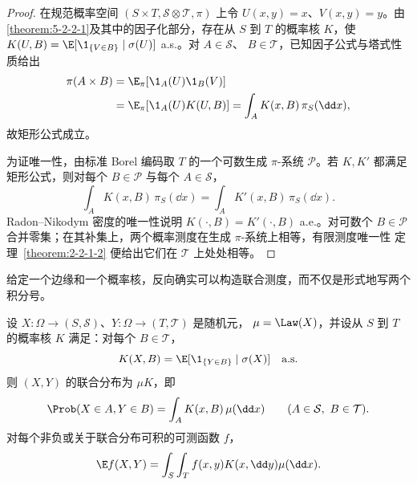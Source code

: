\begin{proof}
在规范概率空间 $(S\times T,\mathcal S\otimes\mathcal T,\pi)$ 上令
$U(x,y)=x$、$V(x,y)=y$。由\cref{theorem:5-2-2-1}及其中的因子化部分，存在从 $S$ 到
$T$ 的概率核 $K$，使
$K(U,B)=\E[\1_{\{V\in B\}}\mid\sigma(U)]$ a.s.。对 $A\in\mathcal S$、
$B\in\mathcal T$，已知因子公式与塔式性质给出
\[
 \begin{aligned}
 \pi(A\times B)
 &=\E_\pi[\1_A(U)\1_B(V)]\\
 &=\E_\pi[\1_A(U)K(U,B)]
 =\int_AK(x,B)\,\pi_S(\dd x),
 \end{aligned}
\]
故矩形公式成立。

为证唯一性，由标准 Borel 编码取 $T$ 的一个可数生成 $\pi$-系统 $\mathcal P$。若 $K,K'$ 都满足
矩形公式，则对每个 $B\in\mathcal P$ 与每个 $A\in\mathcal S$，
\[
 \int_AK(x,B)\,\pi_S(\dd x)=\int_AK'(x,B)\,\pi_S(\dd x).
\]
Radon--Nikodym 密度的唯一性说明 $K(\cdot,B)=K'(\cdot,B)$ a.e.。对可数个
$B\in\mathcal P$ 合并零集；在其补集上，两个概率测度在生成 $\pi$-系统上相等，有限测度唯一性
定理~\ref{theorem:2-2-1-2} 便给出它们在 $\mathcal T$ 上处处相等。
\end{proof}

给定一个边缘和一个概率核，反向确实可以构造联合测度，而不仅是形式地写两个积分号。

\begin{proposition}[核重构联合分布]\label{proposition:5-2-2-4}
设 $X:\Omega\to(S,\mathcal S)$、$Y:\Omega\to(T,\mathcal T)$ 是随机元，
$\mu=\Law(X)$，并设从 $S$ 到 $T$ 的概率核 $K$ 满足：对每个
$B\in\mathcal T$，
\[
 K(X,B)=\E[\1_{\{Y\in B\}}\mid\sigma(X)]\quad\text{a.s.}
\]
则
$(X,Y)$ 的联合分布为 $\mu K$，即
\begin{equation}\label{eq:5-2-joint-from-kernel}
 \Prob(X\in A,Y\in B)=\int_AK(x,B)\,\mu(\dd x)
 \qquad(A\in\mathcal S,\ B\in\mathcal T).
\end{equation}
对每个非负或关于联合分布可积的可测函数 $f$，
\begin{equation}\label{eq:5-2-kernel-fubini}
 \E f(X,Y)=\int_S\int_T f(x,y)K(x,\dd y)\mu(\dd x).
\end{equation}
\end{proposition}

